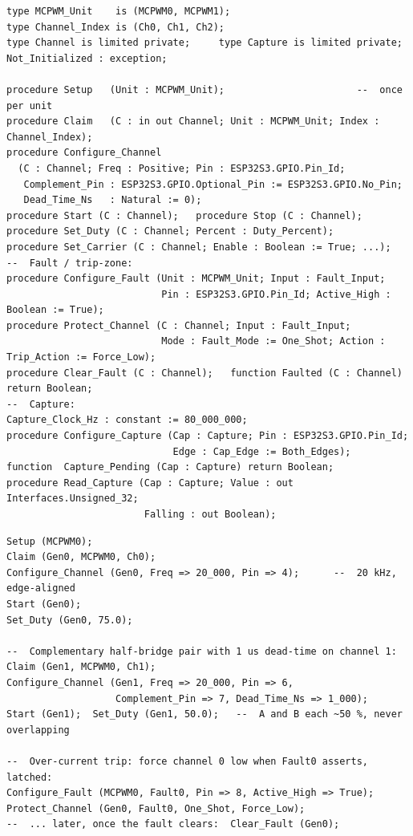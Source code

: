 \begin{lstlisting}
type MCPWM_Unit    is (MCPWM0, MCPWM1);
type Channel_Index is (Ch0, Ch1, Ch2);
type Channel is limited private;     type Capture is limited private;
Not_Initialized : exception;

procedure Setup   (Unit : MCPWM_Unit);                       --  once per unit
procedure Claim   (C : in out Channel; Unit : MCPWM_Unit; Index : Channel_Index);
procedure Configure_Channel
  (C : Channel; Freq : Positive; Pin : ESP32S3.GPIO.Pin_Id;
   Complement_Pin : ESP32S3.GPIO.Optional_Pin := ESP32S3.GPIO.No_Pin;
   Dead_Time_Ns   : Natural := 0);
procedure Start (C : Channel);   procedure Stop (C : Channel);
procedure Set_Duty (C : Channel; Percent : Duty_Percent);
procedure Set_Carrier (C : Channel; Enable : Boolean := True; ...);
--  Fault / trip-zone:
procedure Configure_Fault (Unit : MCPWM_Unit; Input : Fault_Input;
                           Pin : ESP32S3.GPIO.Pin_Id; Active_High : Boolean := True);
procedure Protect_Channel (C : Channel; Input : Fault_Input;
                           Mode : Fault_Mode := One_Shot; Action : Trip_Action := Force_Low);
procedure Clear_Fault (C : Channel);   function Faulted (C : Channel) return Boolean;
--  Capture:
Capture_Clock_Hz : constant := 80_000_000;
procedure Configure_Capture (Cap : Capture; Pin : ESP32S3.GPIO.Pin_Id;
                             Edge : Cap_Edge := Both_Edges);
function  Capture_Pending (Cap : Capture) return Boolean;
procedure Read_Capture (Cap : Capture; Value : out Interfaces.Unsigned_32;
                        Falling : out Boolean);
\end{lstlisting}

\begin{lstlisting}
Setup (MCPWM0);
Claim (Gen0, MCPWM0, Ch0);
Configure_Channel (Gen0, Freq => 20_000, Pin => 4);      --  20 kHz, edge-aligned
Start (Gen0);
Set_Duty (Gen0, 75.0);

--  Complementary half-bridge pair with 1 us dead-time on channel 1:
Claim (Gen1, MCPWM0, Ch1);
Configure_Channel (Gen1, Freq => 20_000, Pin => 6,
                   Complement_Pin => 7, Dead_Time_Ns => 1_000);
Start (Gen1);  Set_Duty (Gen1, 50.0);   --  A and B each ~50 %, never overlapping

--  Over-current trip: force channel 0 low when Fault0 asserts, latched:
Configure_Fault (MCPWM0, Fault0, Pin => 8, Active_High => True);
Protect_Channel (Gen0, Fault0, One_Shot, Force_Low);
--  ... later, once the fault clears:  Clear_Fault (Gen0);
\end{lstlisting}

